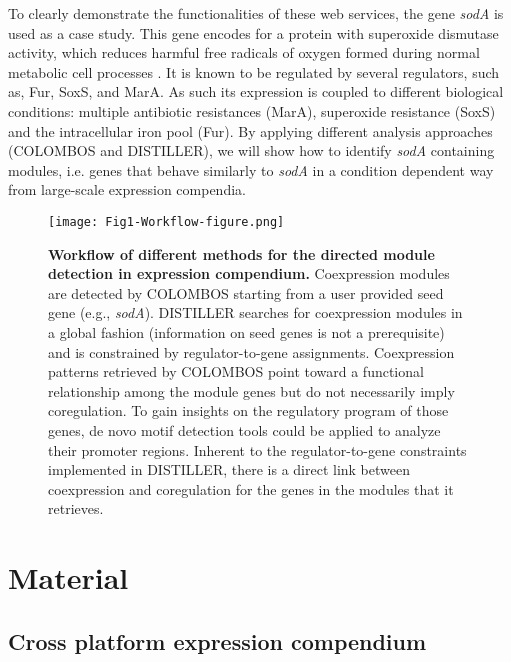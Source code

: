 To clearly demonstrate the functionalities of these web services, the gene \textit{sodA} is used as a case study. This gene encodes for a protein with superoxide dismutase activity, which reduces harmful free radicals of oxygen formed during normal metabolic cell processes \cite{Fawcett1995, Tardat1993, Jair1995}. It is known to be regulated by several regulators, such as, Fur, SoxS, and MarA. As such its expression is coupled to different biological conditions: multiple antibiotic resistances (MarA), superoxide resistance (SoxS) and the intracellular iron pool (Fur). By applying different analysis approaches (COLOMBOS and DISTILLER), we will show how to identify \textit{sodA} containing modules, i.e. genes that behave similarly to \textit{sodA} in a condition dependent way from large-scale expression compendia.

\begin{figure}[tb]
	\centering
  	\texttt{[image: Fig1-Workflow-figure.png]}
	\caption[Workflow of directed module detection in expression 
	compendium]{
	\textbf{Workflow of different methods for the directed module detection in 
	expression compendium.} 
	Coexpression modules are detected by COLOMBOS starting from a user provided 
	seed gene (e.g., \textit{sodA}). 
	DISTILLER searches for coexpression modules in a global fashion 
	(information on seed genes is not a prerequisite) and is constrained by 
	regulator-to-gene assignments. 
	Coexpression patterns retrieved by COLOMBOS point toward a functional 
	relationship among the module genes but do not necessarily imply 
	coregulation. To gain insights on the regulatory program of those genes, de 
	novo motif detection tools could be applied to analyze their promoter 
	regions. Inherent to the regulator-to-gene constraints implemented in 
	DISTILLER, there is a direct link between coexpression and coregulation for 
	the genes in the modules that it retrieves.}
	\label{fig:workflow-distiller-colombos}
\end{figure}




\section{Material}

\subsection{Cross platform expression compendium}\label{sec:dist-comp} 

